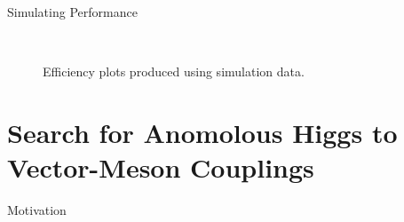 \documentclass[oneside,12pt,final]{sty/ucthesis-CA2012}
\begin{document}
\begin{mainmatter}
\begin{section}{Simulating Performance}
\begin{figure}[htb]
\label{fig:chronoplots}
\begin{center}
\quad
{}\\
\quad
{}
\end{center}
\caption{Efficiency plots produced using simulation data.}
\end{figure}

\end{section}

\chapter{Search for Anomolous Higgs to Vector-Meson Couplings}
\begin{section}{Motivation}


\end{section}
\end{mainmatter}
\end{document}
